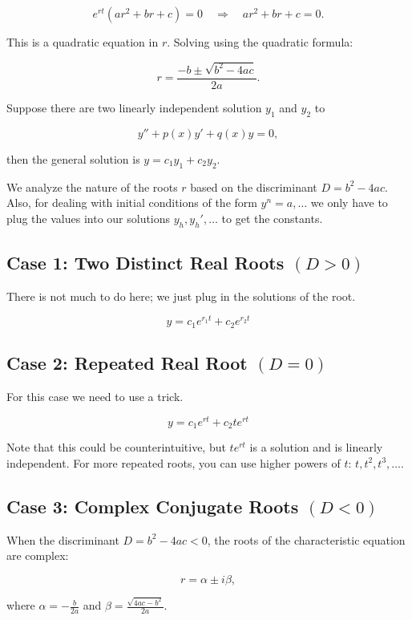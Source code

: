 \[
    e^{rt}(ar^2 + br + c) = 0 \quad \Rightarrow \quad ar^2 + br + c = 0.
\]

This is a quadratic equation in \( r \). Solving using the quadratic formula:

\[
    r = \frac{-b \pm \sqrt{b^2 - 4ac}}{2a}.
\]

Suppose there are two linearly independent solution \(y_1\) and \(y_2\) to

\[
    y'' + p(x)y' + q(x)y = 0,
\]

then the general solution is \(y = c_1 y_1 + c_2 y_2\).

We analyze the nature of the roots \( r \) based on the discriminant \( D = b^2 - 4ac \).
Also, for dealing with initial conditions of the form \(y^n = a, \dots\) we only have to
plug the values into our solutions \(y_h, y_{h}', \dots \) to get the constants.

\subsection{Case 1: Two Distinct Real Roots \texorpdfstring{\( (D > 0) \)}{}}

There is not much to do here; we just plug in the solutions of the root.

\[
    y = c_1 e^{r_1 t} + c_2 e^{r_2 t}
\]

\subsection{Case 2: Repeated Real Root \texorpdfstring{\( (D = 0) \)}{}}

For this case we need to use a trick.

\[
    y = c_1 e^{rt} + c_2 te^{rt}
\]

Note that this could be counterintuitive, but \(te^{rt}\) is a solution and is linearly independent.
For more repeated roots, you can use higher powers of \(t\): \(t, t^2, t^3, \dots\).

\subsection{Case 3: Complex Conjugate Roots \texorpdfstring{\( (D < 0) \)}{}}

When the discriminant \( D = b^2 - 4ac < 0 \), the roots of the characteristic equation are complex:

\[
    r = \alpha \pm i\beta,
\]

where \( \alpha = -\frac{b}{2a} \) and \( \beta = \frac{\sqrt{4ac - b^2}}{2a} \).

